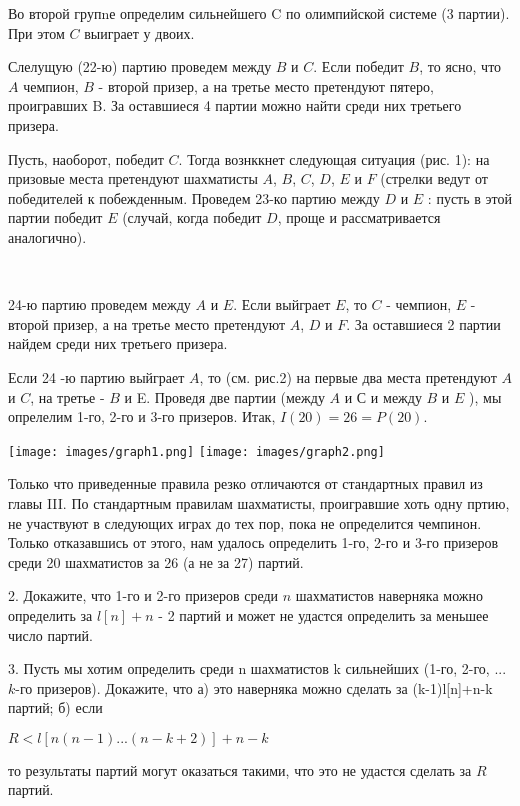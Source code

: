 \documentclass[9pt, a4paper]{article}
\begin{document}
\begin{footnotesize}
\begin{multicols}{3}
Во второй групnе определим сильнейшего $\mathrm{C}$ по олимпийской системе (3 партии). При этом $C$ выиграет у двоих.

Слелущую (22-ю) партию проведем между $B$ и $C$. Если победит $B$, то ясно, что $A$ чемпион, $B$ - второй призер, а на третье место претендуют пятеро, проигравших B. За оставшиеся 4 партии можно найти среди них третьего призера.

Пусть, наоборот, победит $C$. Тогда вознккнет следующая ситуация (рис. 1): на призовые места претендуют шахматисты $A$, $B$, $C$, $D$, $E$ и $F$ (стрелки ведут от победителей к побежденным. Проведем 23-ко партию между $D$ и $E$ : пусть в этой партии победит $E$ (случай, когда победит $D$, проще и рассматривается аналогично).

\hfill 
\\[25pt] 
\break

24-ю партию проведем между $A$ и $E$. Если выйграет $E$, то $C$ - чемпион, $E$ - второй призер, а на третье место претендуют $A$, $D$ и $F$. За оставшиеся 2 партии найдем среди них третьего призера.

Если 24 -ю партию выйграет $A$, то (см. рис.2) на первые два места претендуют $A$ и $C$, на третье - $B$ и E. Проведя две партии (между $A$ и С и между $B$ и $E$ ), мы опрелелим 1-го, 2-го и 3-го призеров. Итак, $I(20)=26=P(20)$.

\columnbreak
\begin{center}
    \texttt{[image: images/graph1.png]}
    \texttt{[image: images/graph2.png]}
\end{center}

Только что приведенные правила резко отличаются от стандартных правил из главы III. По стандартным правилам шахматисты, проигравшие хоть одну пртию, не участвуют в следующих играх до тех пор, пока не определится чемпинон. Только отказавшись от этого, нам удалось определить 1-го, 2-го и 3-го призеров среди 20 шахматистов за 26 (а не за 27) партий.

2. Докажите, что 1-го и 2-го призеров среди $n$ шахматистов наверняка можно определить за $l[n] + n$ - 2 партий и может не удастся определить за меньшее число партий.

3. Пусть мы хотим определить среди n шахматистов k сильнейших (1-го, 2-го, ... $k$-го призеров). Докажите, что
а) это наверняка можно сделать за (k-1)l[n]+n-k партий;
б) если

$
R < l[n(n-1)...(n-k+2)]+n-k
$

то результаты партий могут оказаться такими, что это не удастся сделать за $R$ партий.


\end{multicols}
\end{footnotesize}
\end{document}
